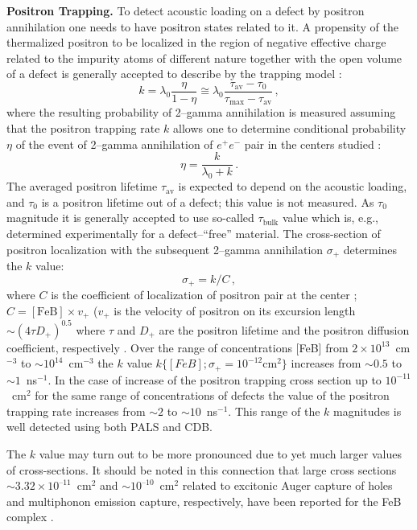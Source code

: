 \documentclass{ttp}
\begin{document}
\noindent \textbf{Positron Trapping.}
To detect acoustic loading on a defect by positron annihilation
one needs to have positron states related to it.
A propensity of the thermalized positron to be localized in the region of negative effective charge
related to the impurity atoms of different nature together
with the open volume of a defect is generally accepted to describe by the trapping model \cite{Brandt1974}:
\begin{equation}\label{eqA1}
  k=\lambda_0\frac{\eta}{1-\eta}\cong\lambda_0\frac{\tau_\mathrm{av}-\tau_0}{\tau_\mathrm{max}-\tau_\mathrm{av}}\,,
\end{equation}
where the resulting probability of  2–gamma annihilation
is measured assuming that the positron trapping rate $k$ allows one
to determine conditional probability $\eta$ of the event
of 2–gamma annihilation of $e^+e^-$ pair in the centers studied \cite{Brandt1974,Arutyunov2013}:
\begin{equation}\label{eqA2}
  \eta=\frac{k}{\lambda_0+k}\,.
\end{equation}
The averaged positron lifetime $\tau_\mathrm{av}$ is expected
to depend on the acoustic loading, and $\tau_0$ is a positron lifetime out of a defect;
this value is not measured.
As $\tau_0$ magnitude it is generally accepted to use so-called $\tau_\mathrm{bulk}$ value which is, e.g.,
determined experimentally for a defect--``free'' material.
The cross-section of positron localization with the subsequent 2--gamma annihilation $\sigma_+$ determines the $k$ value:
\begin{equation}\label{eqA3}
  \sigma_+=k/C\,,
\end{equation}
where $C$ is the coefficient of localization of positron pair at the center \cite{Krause1999};
$C=[\mathrm{FeB}]\times v_+$
($v_+$ is the velocity of positron on its excursion length $\sim (4\tau D_+)^{0.5}$
where $\tau$ and $D_+$ are the positron lifetime and the positron diffusion coefficient, respectively \cite{Krause1999,Brandt1974}.
Over the range of concentrations [FeB] from $2\times10^{13}$~cm$^{−3}$ to $\sim10^{14}$~cm$^{−3}$
the $k$ value $k\{[FeB]; \sigma_+ = 10^{−12} \mathrm{cm}^2\}$
increases from $\sim0.5$ to $\sim1$~ns$^{−1}$.
In the case of increase of the positron trapping cross section up to $10^{−11}$~cm$^2$
for the same range of concentrations of defects the value of the positron trapping rate increases from $\sim2$ to $\sim10$~ns$^{−1}$.
This range of the $k$ magnitudes is well detected using both PALS and CDB.

The $k$ value may turn out to be more pronounced due to yet much larger values of cross-sections.
It should be noted in this connection that large cross sections $\sim\!3.32\times10^{–11}$~cm$^2$
and $\sim\!10^{–10}$~cm$^2$  related to excitonic Auger capture of holes and multiphonon emission capture,
respectively, have been reported for the FeB complex \cite{Paudyal2009,Istratov1999}.
\end{document}
